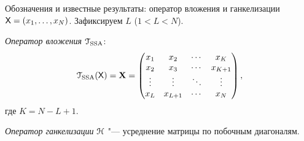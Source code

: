 \documentclass[notheorems, handout]{beamer}
\begin{document}
\begin{frame}{Обозначения и известные результаты: оператор вложения и ганкелизации}
	$\mathsf{X}=(x_1,\ldots,x_N)$. Зафиксируем $L$ ($1<L<N$).\medskip

	\emph{Оператор вложения} $\EuScript{T}_\text{SSA}$:
	\begin{equation*}
		\EuScript{T}_{\text{SSA}}(\mathsf{X})=\mathbf{X}=\begin{pmatrix}
			x_1    & x_2     & \cdots & x_K     \\
			x_2    & x_3     & \cdots & x_{K+1} \\
			\vdots & \vdots  & \ddots & \vdots  \\
			x_L    & x_{L+1} & \cdots & x_N
		\end{pmatrix},
	\end{equation*}
	где $K=N-L+1$.\medskip

	\emph{Оператор ганкелизации} $\EuScript{H}$ "--- усреднение матрицы по побочным диагоналям.
\end{frame}
\end{document}
